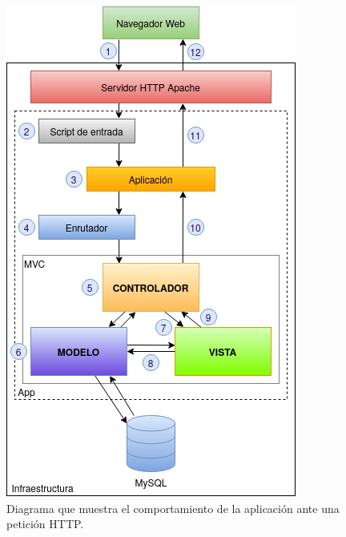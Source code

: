 \documentclass[
]{article}
\begin{document}
\begin{figure}
\hypertarget{mvc-full}{%
\centering
\includegraphics{../_static/images/mvc-full.png}
\caption{Diagrama que muestra el comportamiento de la aplicación ante
una petición HTTP.}\label{mvc-full}
}
\end{figure}
\end{document}
